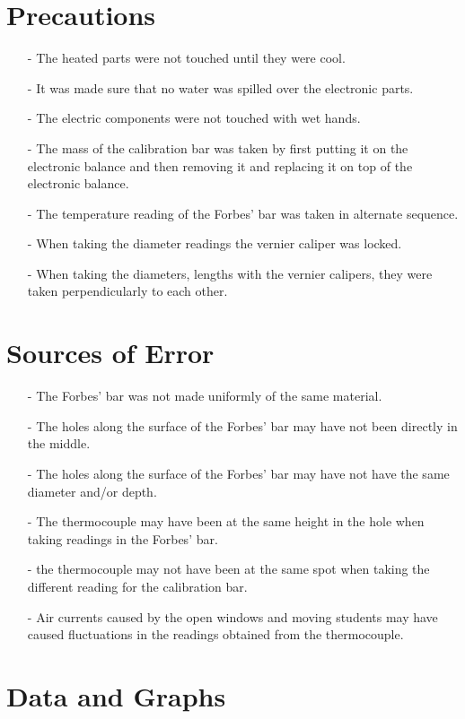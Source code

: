 \documentclass[12pt, a4paper]{article}
\begin{document}
\section*{Precautions}
\begin{itemize}
    \item[-] The heated parts were not touched until they were cool.
    \item[-] It was made sure that no water was spilled over the electronic parts.
    \item[-] The electric components were not touched with wet hands.
    \item[-] The mass of the calibration bar was taken by first putting it on the electronic balance and then removing it and replacing it on top of the electronic balance.
    \item[-] The temperature reading of the Forbes' bar was taken in alternate sequence.
    \item[-] When taking the diameter readings the vernier caliper was locked.
    \item[-] When taking the diameters, lengths with the vernier calipers, they were taken perpendicularly to each other.
\end{itemize}

\section*{Sources of Error}
\begin{enumerate}
    \item[-] The Forbes' bar was not made uniformly of the same material.
    \item[-] The holes along the surface of the Forbes' bar may have not been directly in the middle.
    \item[-] The holes along the surface of the Forbes' bar may have not have the same diameter and/or depth.
    \item[-] The thermocouple may have been at the same height in the hole when taking readings in the Forbes' bar. 
    \item[-] the thermocouple may not have been at the same spot when taking the different reading for the calibration bar.
    \item[-] Air currents caused by the open windows and moving students may have caused fluctuations in the readings obtained from the thermocouple.
\end{enumerate}

\section*{Data and Graphs}
\end{document}
